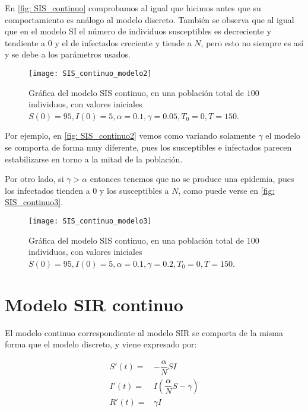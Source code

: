 En \eqref{fig: SIS_continuo} comprobamos al igual que hicimos antes que su comportamiento es análogo al modelo discreto. También se observa que al igual que en el modelo SI el número de individuos susceptibles es decreciente y tendiente a $0$ y el de infectados creciente y tiende a $N$, pero esto no siempre es así y se debe a los parámetros usados.

\begin{figure}
\begin{center}
\caption{Gráfica del modelo SIS continuo, en una población total de $100$ individuos, con valores iniciales $S(0)=95, I(0) = 5, \alpha = 0.1, \gamma = 0.05, T_0 = 0, T = 150$.}
\label{fig: SIS_continuo2}
\texttt{[image: SIS\_continuo\_modelo2]}
\end{center}
\end{figure}


Por ejemplo, en \eqref{fig: SIS_continuo2} vemos como variando solamente $\gamma$ el modelo se comporta de forma muy diferente, pues los susceptibles e infectados parecen estabilizarse en torno a la mitad de la población.

Por otro lado, si $\gamma > \alpha$ entonces tenemos que no se produce una epidemia, pues los infectados tienden a $0$ y los susceptibles a $N$, como puede verse en \eqref{fig: SIS_continuo3}.

\begin{figure}
\begin{center}
\caption{Gráfica del modelo SIS continuo, en una población total de $100$ individuos, con valores iniciales $S(0)=95, I(0) = 5, \alpha = 0.1, \gamma = 0.2, T_0 = 0, T = 150$.}
\label{fig: SIS_continuo3}
\texttt{[image: SIS\_continuo\_modelo3]}
\end{center}
\end{figure}


\section{Modelo SIR continuo}


El modelo continuo correspondiente al modelo SIR se comporta de la misma forma que el modelo discreto, y viene expresado por:

\begin{equation}
\label{eqn: modelo_SIR_continuo}
\begin{aligned}
S'(t) = & -\dfrac{\alpha}{N}SI \\
I'(t) = & I\left(\dfrac{\alpha}{N}S-\gamma \right) \\
R'(t) = & \gamma I
\end{aligned}
\end{equation}


